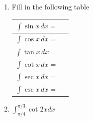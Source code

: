 \documentclass[12pt]{article}
\newif\ifans
\begin{document}
\begin{enumerate}

\item Fill in the following table

\begin{center}
\begin{tabular}{c|c}
$\int{\sin{x}}\,dx=$&\hspace{1 cm}\ifans{\fbox{$-\cos{x}+C$}}\fi \hspace{1 cm}\\
\hline
$\int{\cos{x}}\,dx=$&\hspace{1 cm}\ifans{\fbox{$\sin{x}+C$}}\fi \hspace{1 cm}\\
\hline
$\int{\tan{x}}\,dx=$&\hspace{1 cm}\ifans{\fbox{$\ln{|\sec{x}|}+C$}}\fi \hspace{1 cm}\\
\hline
$\int{\cot{x}}\,dx=$&\hspace{1 cm}\ifans{\fbox{$\ln{|\sin{x}|}+C$}}\fi \hspace{1 cm}\\
\hline
$\int{\sec{x}}\,dx=$&\hspace{1 cm}\ifans{\fbox{$\ln{|\sec{x}+\tan{x}|}+C$}}\fi \hspace{1 cm}\\
\hline
$\int{\csc{x}}\,dx=$&\hspace{1 cm}\ifans{\fbox{$-\ln{|\csc{x}+\cot{x}|}+C$}}\fi \hspace{1 cm}\\
\end{tabular}
\end{center}

\item $\int_{\pi/4}^{\pi/3} \cot{2x}dx$ 

\ifans{\fbox{$\frac{1}{4}\ln{3}-\frac{1}{2}\ln{2}$}} \fi

\end{enumerate}

\end{document}
